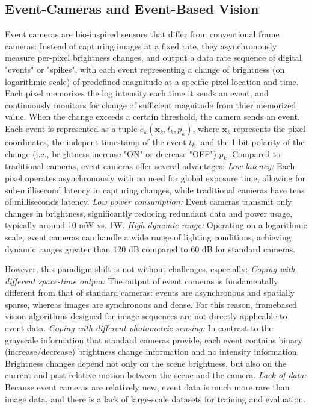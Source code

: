\documentclass{article}
\begin{document}
\subsection{Event-Cameras and Event-Based Vision}
Event cameras are bio-inspired sensors that differ from conventional frame cameras: Instead of capturing images at a fixed rate, they asynchronously measure per-pixel brightness changes, and output a data rate sequence of digital "events" or "spikes", with each event representing a change of brightness (on logarithmic scale) of predefined magnitude at a specific pixel location and time. Each pixel memorizes the log intensity each time it sends an event, and continuously monitors for change of sufficient magnitude from thier memorized value. When the change exceeds a certain threshold, the camera sends an event. Each event is represented as a tuple $e_k(\textbf{x}_k,t_k,p_k)$,
where $\textbf{x}_k$ represents the pixel coordinates, the indepent timestamp of the event $t_k$, and the 1-bit polarity of the change (i.e., brightness increase "ON" or decrease "OFF") $p_k$. Compared to traditional cameras, event cameras offer several advantages: \textit{Low latency:} Each pixel operates asynchronously with no need for global exposure time, allowing for sub-millisecond latency in capturing changes, while traditional cameras have tens of milliseconds latency. \textit{Low power consumption:} Event cameras transmit only changes in brightness, significantly reducing redundant data and power usage, typically around 10 mW vs. 1W. \textit{High dynamic range:} Operating on a logarithmic scale, event cameras can handle a wide range of lighting conditions, achieving dynamic ranges greater than 120 dB compared to 60 dB for standard cameras. 

However, this paradigm shift is not without challenges, especially: \textit{Coping with different space-time output:} The output of event cameras is fundamentally different from that of standard cameras: events are asynchronous and spatially sparse, whereas images are synchronous and dense. For this reason, framebased vision algorithms designed for image sequences are not directly applicable to event data. \textit{Coping with different photometric sensing:} In contrast to the grayscale information that standard cameras provide, each event contains binary (increase/decrease) brightness change information and no intensity information. Brightness changes depend not only on the scene brightness, but also on the current and past relative motion between the scene and the camera. \textit{Lack of data:} Because event cameras are relatively new, event data is much more rare than image data, and there is a lack of large-scale datasets for training and evaluation. 
\end{document}
